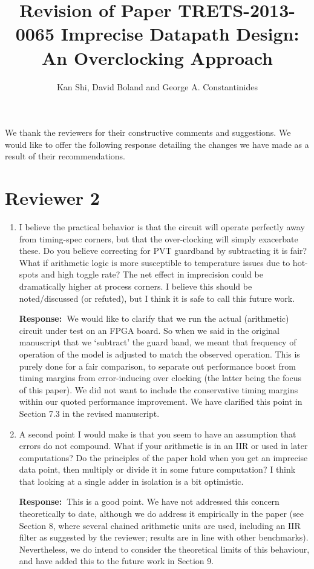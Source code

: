 \documentclass[a4paper, 11pt]{article}
\title{Revision of Paper TRETS-2013-0065 Imprecise Datapath Design: An Overclocking Approach}
\author{Kan Shi, David Boland and George A. Constantinides}
\date{}
\def\Response{\noindent \textbf{Response:~}}
\newcommand{\Question}[1]{\textcolor[rgb]{0.51,0.00,0.00}{#1}}
\begin{document}
\maketitle

We thank the reviewers for their constructive comments and suggestions. We would like to offer the following response detailing the changes we have made as a result of their recommendations.

\section*{Reviewer 2}
\begin{enumerate}
  \item \Question{I believe the practical behavior is that the circuit will operate perfectly away from timing-spec corners, but that the over-clocking will simply exacerbate these. Do you believe correcting for PVT guardband by subtracting it is fair? What if arithmetic logic is more susceptible to temperature issues due to hot-spots and high toggle rate? The net effect in imprecision could be dramatically higher at process corners. I believe this should be noted/discussed (or refuted), but I think it is safe to call this future work.}
      
      \Response We would like to clarify that we run the actual (arithmetic) circuit under test on an FPGA board. So when we said in the original manuscript that we `subtract' the guard band, we meant that frequency of operation of the model is adjusted to match the observed operation. This is purely done for a fair comparison, to separate out performance boost from timing margins from error-inducing over clocking (the latter being the focus of this paper). We did not want to include the conservative timing margins within our quoted performance improvement. We have clarified this point in Section 7.3 in the revised manuscript.\\
      
  \item \Question{A second point I would make is that you seem to have an assumption that errors do not compound. What if your arithmetic is in an IIR or used in later computations? Do the principles of the paper hold when you get an imprecise data point, then multiply or divide it in some future computation?  I think that looking at a single adder in isolation is a bit optimistic.}
      
      \Response This is a good point. We have not addressed this concern theoretically to date, although we do address it empirically in the paper (see Section 8, where several chained arithmetic units are used, including an IIR filter as suggested by the reviewer; results are in line with other benchmarks). Nevertheless, we do intend to consider the theoretical limits of this behaviour, and have added this to the future work in Section 9.\\ 
            

\end{enumerate}
\end{document}
